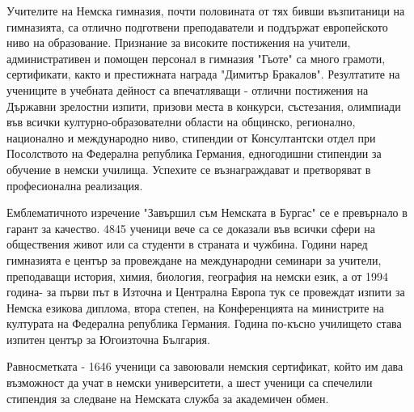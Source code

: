 Учителите на Немска гимназия, почти половината от тях бивши възпитаници на гимназията, са отлично подготвени преподаватели и поддържат европейското ниво на  образование. Признание за високите постижения на учители, административен и помощен персонал в гимназия "Гьоте" са много грамоти, сертификати, както и престижната награда "Димитър Бракалов". Резултатите на учениците в учебната дейност са впечатляващи - отлични постижения на Държавни зрелостни изпити, призови места в конкурси, състезания, олимпиади във всички културно-образователни области на общинско, регионално, национално и международно ниво, стипендии от Консултантски отдел при Посолството на Федерална република Германия, едногодишни стипендии за обучение в немски училища. Успехите се възнаграждават и претворяват в професионална реализация. 

Емблематичното изречение "Завършил съм Немската в Бургас" се е превърнало в гарант за качество. 4845 ученици вече са се доказали във всички сфери на обществения живот или са студенти в страната и чужбина. Години наред гимназията е център за провеждане на международни семинари за учители, преподаващи история, химия, биология, география на немски език, а от 1994 година- за първи път в Източна и Централна Европа тук се провеждат изпити за Немска езикова диплома, втора степен, на Конференцията на министрите на културата на Федерална република Германия. Година по-късно училището става изпитен център за Югоизточна България. 

Равносметката - 1646 ученици са завоювали немския сертификат, който им дава възможност да учат в немски университети, а шест ученици са спечелили стипендия за следване на Немската служба за академичен обмен.

